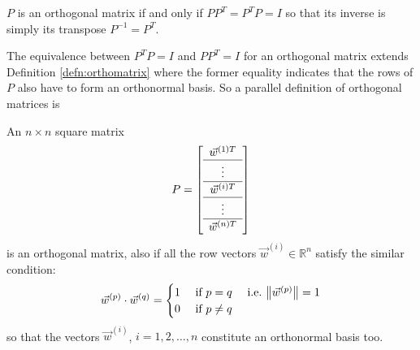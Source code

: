 \begin{proper}
\label{proper:orthoinvT}
$P$ is an orthogonal matrix if and only if $PP^T = P^TP = I$ so that its inverse is simply its transpose $P^{-1} = P^T$.
\end{proper}
The equivalence between $P^TP=I$ and $PP^T = I$ for an orthogonal matrix extends Definition \ref{defn:orthomatrix} where the former equality indicates that the rows of $P$ also have to form an orthonormal basis. So a parallel definition of orthogonal matrices is
\begin{defn}
An $n \times n$ square matrix
\begin{align*}
P = \left[
\begin{array}{c}
\vec{w}^{(1)T}\\
\hline
\vdots \\
\hline
\vec{w}^{(i)T} \Tstrut \\
\hline
\vdots \\
\hline
\vec{w}^{(n)T} \Tstrut 
\end{array}
\right]
\end{align*}
is an orthogonal matrix, also if all the row vectors $\vec{w}^{(i)} \in \mathbb{R}^n$ satisfy the similar condition:
\begin{align*}
\vec{w}^{(p)} \cdot \vec{w}^{(q)} =
\begin{cases}
1 &\text{ if } p = q \quad \text{ i.e.\ } \norm{\vec{w}^{(p)}} = 1 \\
0 &\text{ if } p \neq q    
\end{cases}
\end{align*}
so that the vectors $\vec{w}^{(i)}$, $i=1,2,\ldots,n$ constitute an orthonormal basis too.
\end{defn}

